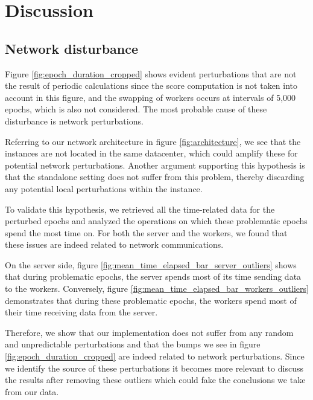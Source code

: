 \chapter{Discussion}

\section{Network disturbance}
Figure \ref{fig:epoch_duration_cropped} shows evident perturbations that are not the result of periodic calculations since the score computation is not taken into account in this figure, and the swapping of workers occurs at intervals of 5,000 epochs, which is also not considered. The most probable cause of these disturbance is network perturbations.

Referring to our network architecture in figure \ref{fig:architecture}, we see that the instances are not located in the same datacenter, which could amplify these for potential network perturbations. Another argument supporting this hypothesis is that the standalone setting does not suffer from this problem, thereby discarding any potential local perturbations within the instance.

To validate this hypothesis, we retrieved all the time-related data for the perturbed epochs and analyzed the operations on which these problematic epochs spend the most time on. For both the server and the workers, we found that these issues are indeed related to network communications.

On the server side, figure \ref{fig:mean_time_elapsed_bar_server_outliers} shows that during problematic epochs, the server spends most of its time sending data to the workers. Conversely, figure \ref{fig:mean_time_elapsed_bar_workers_outliers} demonstrates that during these problematic epochs, the workers spend most of their time receiving data from the server.

Therefore, we show that our implementation does not suffer from any random and unpredictable perturbations and that the bumps we see in figure \ref{fig:epoch_duration_cropped} are indeed related to network perturbations. Since we identify the source of these perturbations it becomes more relevant to discuss the results after removing these outliers which could fake the conclusions we take from our data.


